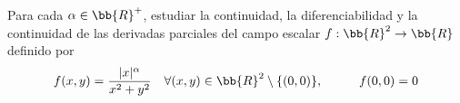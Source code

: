\begin{ejercicio}
    Para cada $ \alpha \in \bb{R}^+$, estudiar la continuidad, la diferenciabilidad y la continuidad de las derivadas parciales del campo escalar $f: \bb{R}^2 \to \bb{R}$ definido por 
    \begin{equation*}
        f(x,y) = \frac{|x|^{\alpha}}{x^2 + y^2} \quad \forall (x,y) \in \bb{R}^2\setminus\{(0,0)\}, \hspace{1cm}   f(0,0) = 0
    \end{equation*}
    \begin{comment}

    Sea $C=\{(x,y)\in \bb{R}^2\mid x=0\}$. Tenemos que es un cerrado, por lo que $U=\bb{R}^2\setminus C$ es un abierto. Tenemos que $f_{\big| U}$ es cociente de dos funciones. El denominador es polinómica, por lo que es de clase $1$. El numerador es una composición del valor absoluto (que es de clase $1$ en $U$), con la potencia de orden positivo, que es de clase $1$ en $\bb{R}^+$. Por tanto, $f_{\big| U}$ es de clase $1$. Por el carácter local de la derivabilidad y la continuidad, tenemos que $f$ es continua y diferenciable en todo punto de $U$. Además, sus derivadas parciales son continuas en todo punto de $U$, siendo estas en todo $(x,y)\in U$:
    \begin{gather*}
        \del{f}{x}(x,y) = \frac{\alpha|x|^{\alpha-1}\cdot \frac{x}{|x|}\cdot (x^2+y^2) - |x|^\alpha(2x)}{(x^2+y^2)^2}
        = \frac{\alpha x\cdot |x|^{\alpha-2}\cdot (x^2+y^2) - |x|^\alpha(2x)}{(x^2+y^2)^2} \\
        \del{f}{y}(x,y) = \frac{-2y|x|^\alpha}{(x^2+y^2)^2}
    \end{gather*}

    Buscamos ahora saber el valor de las derivadas parciales en todo punto de $C$. Sabemos que $C=\{(0,c) \mid c\in \bb{R}\}$. Por facilidad, calculamos en primer lugar la derivada parcial respecto de $y$.
    \begin{equation*}
        \del{f}{y}(0,c) = \lim_{y\to c} \frac{f(0,y) - f(0,c)}{y-c}
        = \lim_{y\to c} \frac{f(0,y) - f(0,c)}{y-c}
        = \lim_{y\to c} \frac{0-0}{y-c} = 0
    \end{equation*}
    donde he empleado que $f(0,y)=0 \qquad \forall y\in \bb{R}$.

    A partir de ahora, estudiamos el origen por separado:
    \begin{enumerate}
        \item \ul{Para $c\neq 0$}:

        Veamos ahora el valor de la derivada parcial respecto de $x$:
        \begin{equation*}
            \del{f}{x}(0,c) = \lim_{x\to 0} \frac{f(x,c) - f(0,c)}{x-0}
            = \lim_{x\to 0} \frac{|x|^\alpha}{x(x^2+c^2)}
            = \lim_{x\to 0} \frac{|x|}{x}\cdot \frac{|x|^{\alpha-1}}{x^2+c^2}
        \end{equation*}
    

\end{comment}
\end{ejercicio}
